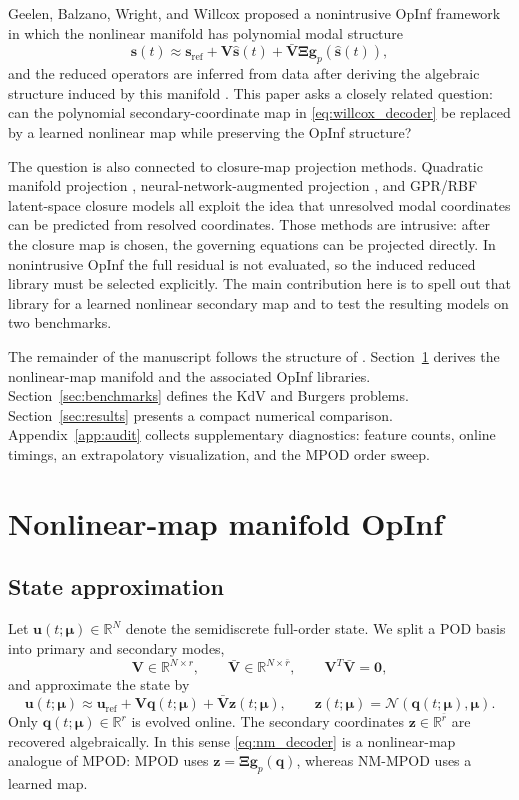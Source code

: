 \documentclass[11pt]{article}
\newcommand{\RR}{\mathbb{R}}
\newcommand{\bu}{\mathbf u}
\newcommand{\bs}{\mathbf s}
\newcommand{\bq}{\boldsymbol q}
\newcommand{\bz}{\boldsymbol z}
\newcommand{\bmu}{\boldsymbol\mu}
\newcommand{\bzero}{\mathbf 0}
\newcommand{\bV}{\mathbf V}
\newcommand{\bVbar}{\bar{\mathbf V}}
\newcommand{\bXi}{\boldsymbol\Xi}
\newcommand{\uref}{\mathbf u_{\mathrm{ref}}}
\newcommand{\Nmap}{\mathcal{N}}
\newcommand{\qdim}{r}
\newcommand{\rbar}{\bar r}
\begin{document}
Geelen, Balzano, Wright, and Willcox proposed a nonintrusive OpInf framework in
which the nonlinear manifold has polynomial modal structure
\begin{equation}
  \bs(t)\approx \bs_{\mathrm{ref}}
  +\bV\widehat{\bs}(t)+\bVbar\bXi\boldsymbol g_p(\widehat{\bs}(t)),
  \label{eq:willcox_decoder}
\end{equation}
and the reduced operators are inferred from data after deriving the algebraic
structure induced by this manifold \cite{geelen2024learning}.  This paper asks
a closely related question: can the polynomial secondary-coordinate map in
\eqref{eq:willcox_decoder} be replaced by a learned nonlinear map while
preserving the OpInf structure?

The question is also connected to closure-map projection methods.  Quadratic
manifold projection \cite{barnett2022quadratic}, neural-network-augmented
projection \cite{barnett2023neural}, and GPR/RBF latent-space closure models
\cite{aresdeparga2025closure} all exploit the idea that unresolved modal
coordinates can be predicted from resolved coordinates.  Those methods are
intrusive: after the closure map is chosen, the governing equations can be
projected directly.  In nonintrusive OpInf the full residual is not evaluated,
so the induced reduced library must be selected explicitly.  The main
contribution here is to spell out that library for a learned nonlinear
secondary map and to test the resulting models on two benchmarks.

The remainder of the manuscript follows the structure of
\cite{geelen2024learning}.  Section~\ref{sec:method} derives the nonlinear-map
manifold and the associated OpInf libraries.  Section~\ref{sec:benchmarks}
defines the KdV and Burgers problems.  Section~\ref{sec:results} presents a
compact numerical comparison.  Appendix~\ref{app:audit} collects
supplementary diagnostics: feature counts, online timings, an extrapolatory
visualization, and the MPOD order sweep.

\section{Nonlinear-map manifold OpInf}
\label{sec:method}

\subsection{State approximation}

Let $\bu(t;\bmu)\in\RR^N$ denote the semidiscrete full-order state.  We split a
POD basis into primary and secondary modes,
\[
  \bV\in\RR^{N\times \qdim},\qquad
  \bVbar\in\RR^{N\times\rbar},\qquad
  \bV^T\bVbar=\bzero,
\]
and approximate the state by
\begin{equation}
  \bu(t;\bmu)
  \approx
  \uref+\bV\bq(t;\bmu)+\bVbar\bz(t;\bmu),
  \qquad
  \bz(t;\bmu)=\Nmap(\bq(t;\bmu),\bmu).
  \label{eq:nm_decoder}
\end{equation}
Only $\bq(t;\bmu)\in\RR^{\qdim}$ is evolved online.  The secondary coordinates
$\bz\in\RR^{\rbar}$ are recovered algebraically.  In this sense
\eqref{eq:nm_decoder} is a nonlinear-map analogue of MPOD: MPOD uses
$\bz=\bXi\boldsymbol g_p(\bq)$, whereas NM-MPOD uses a learned map.
\end{document}
